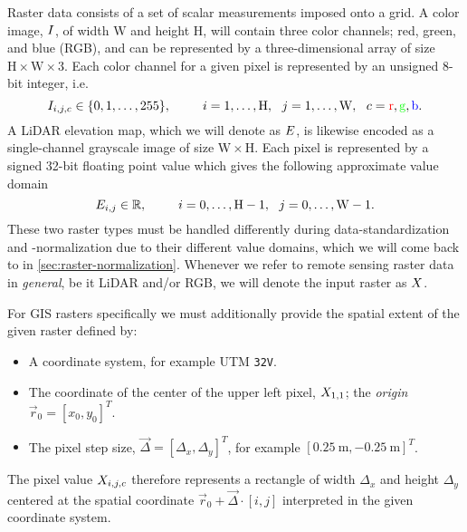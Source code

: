 Raster data consists of a set of scalar measurements imposed onto a grid.
A color image, $I$, of width $\mathrm{W}$ and height $\mathrm{H}$, will contain three color channels; red, green, and blue (RGB), and can be represented by a three-dimensional array of size $\mathrm{H} \times \mathrm{W} \times \mathrm{3}$.
Each color channel for a given pixel is represented by an unsigned 8-bit integer, i.e.
%
\begin{equation*}
  I_{i, j, c} \in \{0, 1, \ldots, 255\},
  \hspace{2.5em}
  i = 1, \ldots, \mathrm{H} ,
  ~~
  j = 1, \ldots, \mathrm{W},
  ~~
  c = \mathrm{\textcolor{red}{r}, \textcolor{green}{g}, \textcolor{blue}{b}}.
\end{equation*}
%
A LiDAR elevation map, which we will denote as $E$, is likewise encoded as a single-channel grayscale image of size $\mathrm{W} \times \mathrm{H}$.
Each pixel is represented by a signed 32-bit floating point value which gives the following approximate value domain
%
\begin{equation*}
  E_{i, j} \in \mathbb{R},
  \hspace{2.5em}
  i = 0, \ldots, \mathrm{H} - 1,
  ~~
  j = 0, \ldots, \mathrm{W} - 1.
\end{equation*}
%
These two raster types must be handled differently during data-standardization and -normalization due to their different value domains, which we will come back to in \cref{sec:raster-normalization}.
Whenever we refer to remote sensing raster data in \emph{general}, be it LiDAR and/or RGB, we will denote the input raster as $X$.

For GIS rasters specifically we must additionally provide the spatial extent of the given raster defined by:
\begin{itemize}[noitemsep]
  \item A coordinate system, for example UTM \texttt{32V}.
  \item The coordinate of the center of the upper left pixel, $X_{1, 1}$; the \textit{origin} $\vec{r}_0 = {[x_0, y_0]}^T$.
  \item The pixel step size, $\vec{\Delta} = {[\Delta_x, \Delta_y]}^T$, for example ${[\SI{0.25}{\meter}, \SI{-0.25}{\meter}]}^T$.
\end{itemize}

The pixel value $X_{i, j, c}$ therefore represents a rectangle of width $\Delta_x$ and height $\Delta_y$ centered at the spatial coordinate $\vec{r}_0 + \vec{\Delta} \cdot [i, j]$ interpreted in the given coordinate system.

